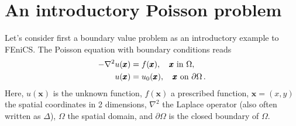 \documentclass[final,3p,times,twocolumn]{elsarticle}
\newcounter{bla}
\begin{document}
\section{An introductory Poisson problem}
Let's consider first a boundary value problem as an introductory example to FEniCS. The Poisson equation with boundary conditions reads
\begin{align}
   - \nabla^2 u(\pmb{x}) &= f(\pmb{x}),\quad \pmb{x}\mbox{ in } \Omega, \label{eq:PoissonPDE}
        \\
    u(\pmb{x}) &= u_0(\pmb{x}),\quad \pmb{x}\mbox{ on } \partial \Omega\thinspace . \notag
\end{align}
Here, $u(\pmb{x})$ is the unknown function, $f(\pmb{x})$ a
prescribed function, $\pmb{x}=(x, y)$ the spatial coordinates in 2 dimensions, $\nabla^2$ the Laplace operator (also
often written as $\Delta$), $\Omega$ the spatial domain, and
$\partial\Omega$ is the closed boundary of $\Omega$. 
\end{document}
